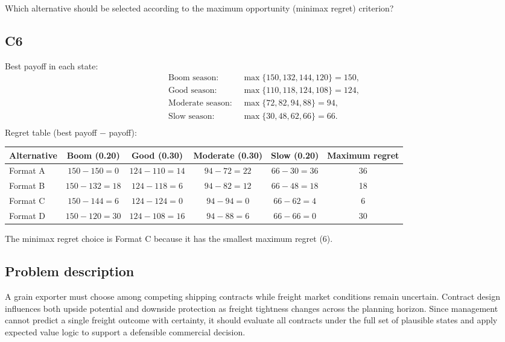 \begin{ExamProblems}
		Which alternative should be selected according to the maximum opportunity (minimax regret) criterion?

		\subsection*{C6}
		Best payoff in each state:
		\[
		\begin{aligned}
			\text{Boom season: } &\max\{150, 132, 144, 120\} = 150, \\
			\text{Good season: } &\max\{110, 118, 124, 108\} = 124, \\
			\text{Moderate season: } &\max\{72, 82, 94, 88\} = 94, \\
			\text{Slow season: } &\max\{30, 48, 62, 66\} = 66. \\
		\end{aligned}
		\]
		Regret table (best payoff $-$ payoff):
		\begin{center}
			\begin{tabular}{l c c c c c}
				\toprule
				Alternative & Boom (0.20) & Good (0.30) & Moderate (0.30) & Slow (0.20) & Maximum regret \\
				\midrule
				Format A & $150-150=0$ & $124-110=14$ & $94-72=22$ & $66-30=36$ & 36 \\
				Format B & $150-132=18$ & $124-118=6$ & $94-82=12$ & $66-48=18$ & 18 \\
				Format C & $150-144=6$ & $124-124=0$ & $94-94=0$ & $66-62=4$ & 6 \\
				Format D & $150-120=30$ & $124-108=16$ & $94-88=6$ & $66-66=0$ & 30 \\
				\bottomrule
			\end{tabular}
		\end{center}
		The minimax regret choice is Format C because it has the smallest maximum regret (6).
		\item
		\subsection*{Problem description}
		A grain exporter must choose among competing shipping contracts while freight market conditions remain uncertain. Contract design influences both upside potential and downside protection as freight tightness changes across the planning horizon. Since management cannot predict a single freight outcome with certainty, it should evaluate all contracts under the full set of plausible states and apply expected value logic to support a defensible commercial decision.


\end{ExamProblems}

